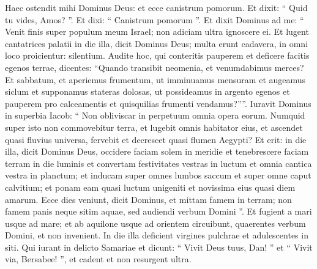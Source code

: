 \begin{biblechapter}
\begin{biblechapter}
\begin{biblechapter}
\begin{biblechapter}
\begin{biblechapter}
\begin{biblechapter}
\begin{biblechapter}
\begin{biblechapter}
\verse Haec ostendit mihi Dominus Deus:
 et ecce canistrum pomorum.
 \verse Et dixit: “ Quid tu vides, Amos? ”.
 Et dixi: “ Canistrum pomorum ”.
 Et dixit Dominus ad me:
 “ Venit finis super populum meum Israel;
 non adiciam ultra ignoscere ei.
 \verse Et lugent cantatrices palatii in die illa,
 dicit Dominus Deus;
 multa erunt cadavera,
 in omni loco proicientur: silentium.
 \verse Audite hoc, qui conteritis pauperem
 et deficere facitis egenos terrae,
 \verse dicentes: “Quando transibit neomenia,
 et venumdabimus merces?
 Et sabbatum, et aperiemus frumentum,
 ut imminuamus mensuram et augeamus siclum
 et supponamus stateras dolosas,
 \verse ut possideamus in argento egenos
 et pauperem pro calceamentis
 et quisquilias frumenti vendamus?””.
 \verse Iuravit Dominus in superbia Iacob:
 “ Non obliviscar in perpetuum omnia opera eorum.
 \verse Numquid super isto non commovebitur terra,
 et lugebit omnis habitator eius,
 et ascendet quasi fluvius universa,
 fervebit et decrescet quasi flumen Aegypti?
 \verse Et erit: in die illa,
 dicit Dominus Deus,
 occidere faciam solem in meridie
 et tenebrescere faciam terram in die luminis
 \verse et convertam festivitates vestras in luctum
 et omnia cantica vestra in planctum;
 et inducam super omnes lumbos saccum
 et super omne caput calvitium;
 et ponam eam quasi luctum unigeniti
 et novissima eius quasi diem amarum.
 \verse Ecce dies veniunt,
 dicit Dominus,
 et mittam famem in terram;
 non famem panis neque sitim aquae,
 sed audiendi verbum Domini ”.
 \verse Et fugient a mari usque ad mare;
 et ab aquilone usque ad orientem circuibunt,
 quaerentes verbum Domini,
 et non invenient.
 \verse In die illa deficient virgines pulchrae
 et adulescentes in siti.
 \verse Qui iurant in delicto Samariae
 et dicunt: “ Vivit Deus tuus, Dan! ”
 et “ Vivit via, Bersabee! ”,
 et cadent et non resurgent ultra.
 

\end{biblechapter}
\end{biblechapter}
\end{biblechapter}
\end{biblechapter}
\end{biblechapter}
\end{biblechapter}
\end{biblechapter}
\end{biblechapter}
